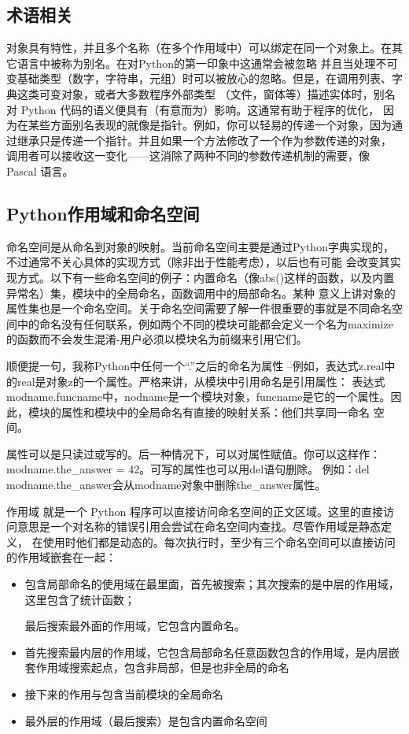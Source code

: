 \documentclass[UTF8]{ctexart}
\begin{document}
\subsection{术语相关}
对象具有特性，并且多个名称（在多个作用域中）可以绑定在同一个对象上。在其它语言中被称为别名。在对Python的第一印象中这通常会被忽略
并且当处理不可变基础类型（数字，字符串，元组）时可以被放心的忽略。但是，在调用列表、字典这类可变对象，或者大多数程序外部类型
（文件，窗体等）描述实体时，别名对 Python 代码的语义便具有（有意而为）影响。这通常有助于程序的优化，
因为在某些方面别名表现的就像是指针。例如，你可以轻易的传递一个对象，因为通过继承只是传递一个指针。并且如果一个方法修改了一个作为参数传递的对象，
调用者可以接收这一变化——这消除了两种不同的参数传递机制的需要，像 Pascal 语言。
\subsection{Python作用域和命名空间}
命名空间是从命名到对象的映射。当前命名空间主要是通过Python字典实现的，不过通常不关心具体的实现方式（除非出于性能考虑），以后也有可能
会改变其实现方式。以下有一些命名空间的例子：内置命名（像abs()这样的函数，以及内置异常名）集，模块中的全局命名，函数调用中的局部命名。某种
意义上讲对象的属性集也是一个命名空间。关于命名空间需要了解一件很重要的事就是不同命名空间中的命名没有任何联系，例如两个不同的模块可能都会定义一个名为maximize
的函数而不会发生混淆-用户必须以模块名为前缀来引用它们。

顺便提一句，我称Python中任何一个``.''之后的命名为属性 --例如，表达式z.real中的real是对象z的一个属性。严格来讲，从模块中引用命名是引用属性：
表达式modname.funcname中，nodname是一个模块对象，funcname是它的一个属性。因此，模块的属性和模块中的全局命名有直接的映射关系：他们共享同一命名
空间。

属性可以是只读过或写的。后一种情况下，可以对属性赋值。你可以这样作：modname.the\_answer = 42。可写的属性也可以用del语句删除。
例如：del modname.the\_answer会从modname对象中删除the\_answer属性。

作用域 就是一个 Python 程序可以直接访问命名空间的正文区域。这里的直接访问意思是一个对名称的错误引用会尝试在命名空间内查找。尽管作用域是静态定义，
在使用时他们都是动态的。每次执行时，至少有三个命名空间可以直接访问的作用域嵌套在一起：
\begin{itemize}
  \item 包含局部命名的使用域在最里面，首先被搜索；其次搜索的是中层的作用域，这里包含了统计函数；

  最后搜索最外面的作用域，它包含内置命名。
  \item 首先搜索最内层的作用域，它包含局部命名任意函数包含的作用域，是内层嵌套作用域搜索起点，包含非局部，但是也非全局的命名
  \item 接下来的作用与包含当前模块的全局命名
  \item 最外层的作用域（最后搜索）是包含内置命名空间
\end{itemize}
\end{document}
